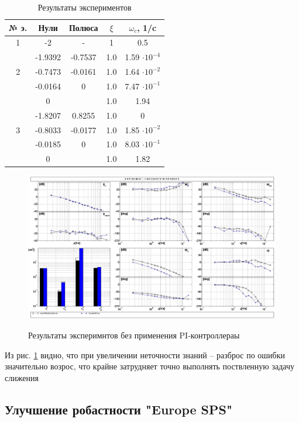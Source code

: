 \begin{table}[H]
    \caption{Результаты экспериментов}
    \centering
    \label{tab:Результаты экспериментов без PI2}
    \begin{tabular}{|c|c|c|c|c|}
        \hline 
        № э.&Нули & Полюса & $\xi$ & $\omega_c$, 1/c \\ \hline 
        1& -2 & - & 1 &0.5 \\ \hline
        & -1.9392 & -0.7537  & 1.0 & 1.59 $\cdot 10^{-4}$\\ 
        2& -0.7473 & -0.0161  & 1.0 & 1.64 $\cdot 10^{-2}$\\ 
        & -0.0164 &  0 & 1.0 &7.47 $\cdot 10^{-1}$\\ 
        & 0 &   &  1.0 &1.94 \\ \hline 
        & -1.8207 & 0.8255 & 1.0 &0\\ 
        3& -0.8033 & -0.0177 & 1.0 &1.85 $\cdot 10^{-2}$\\ 
        & -0.0185 & 0 & 1.0 &8.03 $\cdot 10^{-1}$ \\ 
        & 0 &  &  1.0&1.82 \\ \hline
    \end{tabular}
\end{table}


\begin{figure}[H]
    \centering \includegraphics[width=\linewidth]{Оглавление/Part3/figures/testo2.jpg}
    \caption{Результаты эксперимнтов без применения PI-контроллераы}
    {\label{fig:Модель без PI 80}}
\end{figure}
Из рис. {\ref{fig:Модель без PI 80}} видно, что при увеличении неточности знаний --  разброс по ошибки значительно возрос, что
крайне затрудняет точно выполнять поствленную задачу слижения

\subsection{Улучшение робастности "Europe SPS"}
{\label{sec:Улучшение робастности}}

